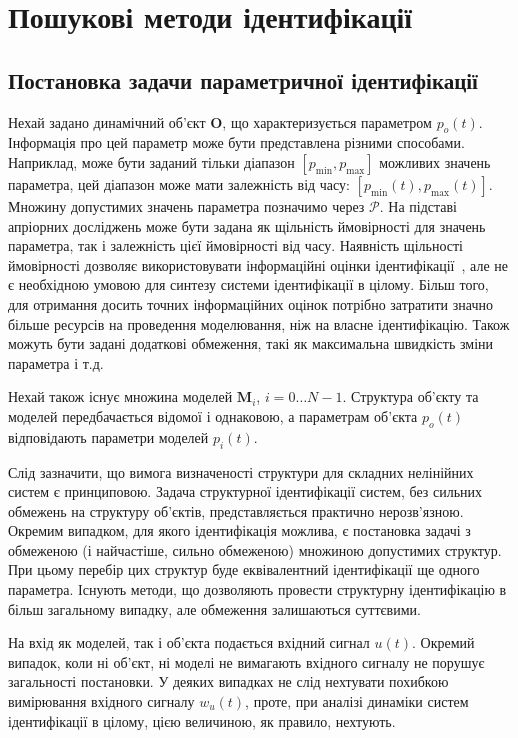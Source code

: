 \chapter{Пошукові методи ідентифікації}

\section{Постановка задачи параметричної ідентифікації} %

Нехай задано динамічний об'єкт
$\mathbf{O}$, що характеризується параметром
$p_o(t)$\label{atu:d:p_o}. Інформація про цей параметр може бути представлена
різними способами. Наприклад, може бути заданий тільки
діапазон
$[p_{\min}, p_{\max}]$ можливих значень параметра, цей діапазон може
мати залежність від часу:
$[p_{\min}(t), p_{\max}(t)]$.
Множину допустимих
значень параметра позначимо через
$\mathcal{P}$. На підставі апріорних досліджень може бути задана
як щільність ймовірності для значень параметра, так і
залежність цієї ймовірності від часу. Наявність щільності
ймовірності дозволяє використовувати інформаційні оцінки
ідентифікації~\cite{info_cipkin, atu_asau10}, але не є необхідною умовою
для синтезу системи ідентифікації в цілому. Більш того,
для отримання досить точних інформаційних оцінок потрібно
затратити значно більше ресурсів на проведення моделювання,
ніж на власне ідентифікацію. Також можуть бути задані додаткові
обмеження, такі як максимальна швидкість зміни параметра і т.д.

Нехай також існує множина моделей \label{atu:d:N}$\mathbf{M}_i$,
$i = 0 \ldots N-1$. Структура об'єкту та моделей передбачається відомої і
однаковою, а параметрам об'єкта
$p_o(t)$ відповідають параметри моделей
$p_{i}(t)$.

Слід зазначити, що вимога визначеності структури для складних
нелінійних систем є принциповою. Задача структурної
ідентифікації систем, без сильних обмежень на структуру
об'єктів, представляється практично нерозв'язною. Окремим
випадком, для якого ідентифікація можлива, є постановка
задачі з обмеженою (і найчастіше, сильно обмеженою) множиною
допустимих структур. При цьому перебір цих структур буде
еквівалентний ідентифікації ще одного параметра. Існують
методи, що дозволяють провести структурну ідентифікацію в
більш загальному випадку, але обмеження залишаються суттєвими.



На вхід як моделей, так і об'єкта подається вхідний сигнал
\label{atu:d:u}$u(t)$.
Окремий випадок, коли ні об'єкт, ні моделі не вимагають
вхідного сигналу не порушує загальності постановки. У деяких
випадках не слід нехтувати похибкою вимірювання вхідного
сигналу $w_u(t)$, проте, при аналізі динаміки систем ідентифікації в
цілому, цією величиною, як правило, нехтують.

